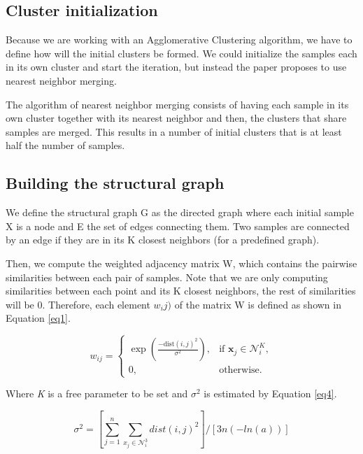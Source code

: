 \documentclass[
	10pt,
	parskip=half-,	
	paper=a4,
	english
	]{scrartcl}
\begin{document}
\subsection{Cluster initialization}

Because we are working with an Agglomerative Clustering algorithm, we have to define how will the initial clusters be formed. We could initialize the samples each in its own cluster and start the iteration, but instead the paper proposes to use nearest neighbor merging. 

The algorithm of nearest neighbor merging consists of having each sample in its own cluster together with its nearest neighbor and then, the clusters that share samples are merged. This results in a number of initial clusters that is at least half the number of samples.

\subsection{Building the structural graph}

We define the structural graph G as the directed graph where each initial sample X is a node and E the set of edges connecting them. Two samples are connected by an edge if they are in its K closest neighbors (for a predefined graph).

Then, we compute the weighted adjacency matrix W, which contains the pairwise similarities between each pair of samples. Note that we are only computing similarities between each point and its K closest neighbors, the rest of similarities will be 0. Therefore, each element \(w_ij)\) of the matrix W is defined as shown in Equation \ref{eq1}.

\begin{equation}
    w_{ij} =
    \begin{cases} 
    \exp \left( \frac{-\text{dist}(i,j)^2}{\sigma^2} \right), & \text{if } \mathbf{x}_j \in \mathcal{N}_i^K, \\
    0, & \text{otherwise}.
    \end{cases}
    \label{eq1}
\end{equation}

Where \textit{K} is a free parameter to be set and \(\sigma^2\) is estimated by Equation \ref{eq4}.

\begin{equation}
    \sigma^2 = [\sum_{j=1}^{n}\sum_{x_j\in \mathcal{N}_i^3}dist(i,j)^2] / [3n(-ln(a))]
    \label{eq4}    
\end{equation}
\end{document}
